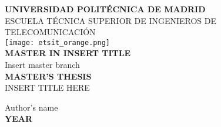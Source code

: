 \begin{titlepage}

	\newlength{\centeroffset}
	\setlength{\centeroffset}{-0.5\oddsidemargin}
	\addtolength{\centeroffset}{0.5\evensidemargin}
	\thispagestyle{empty}

	\noindent\hspace*{\centeroffset}\begin{minipage}{\textwidth}

		\pagecolor{portada}
		\centering
		\LARGE{\textbf{UNIVERSIDAD POLITÉCNICA DE MADRID}}\\[0.7cm]
		\Large{ESCUELA TÉCNICA SUPERIOR DE INGENIEROS DE TELECOMUNICACIÓN}\\[0.7cm]
		\texttt{[image: etsit\_orange.png]}\\[1cm]
		\LARGE{\textbf{MASTER IN INSERT TITLE}}\\
		\large{Insert master branch}\\[4.7cm]
		
		\LARGE{\textbf{MASTER'S THESIS}\\[2cm]}
		\LARGE{INSERT TITLE HERE}\\

	\end{minipage}

	\vspace{2.6cm}
	\noindent\hspace*{\centeroffset}\begin{minipage}{\textwidth}
		\centering

		\Large{Author's name}\\[2ex]
		\Large{\textbf{YEAR}}
	\end{minipage}
\end{titlepage}

\pagecolor{white}
\thispagestyle{empty}
\cleardoublepage

